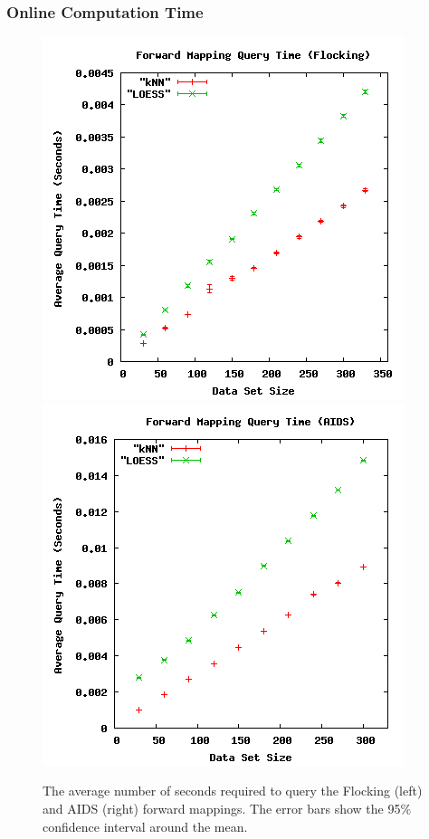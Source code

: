   \subsubsection{Online Computation Time}

\begin{figure}[ht]
\centering
\includegraphics[scale=.4]{images/results_flocking/fmquery.png}
\includegraphics[scale=.4]{images/results_aids/aids-fmquery.png}
\caption{The average number of seconds required to query the Flocking (left) and AIDS (right) forward mappings.
The error bars show the 95\% confidence interval around the mean.}
\label{fig:fmquery}
\end{figure}



